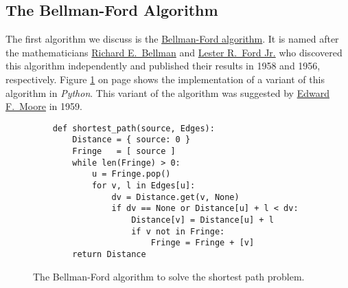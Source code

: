 \subsection{The Bellman-Ford Algorithm}
The first algorithm we discuss is the
\href{https://en.wikipedia.org/wiki/Bellman-Ford_algorithm}{Bellman-Ford algorithm}.
It is named after the mathematicians 
\href{https://en.wikipedia.org/wiki/Richard_E._Bellman}{Richard E.~Bellman} \cite{bellman:58} and 
\href{https://en.wikipedia.org/wiki/L._R._Ford_Jr.}{Lester R.~Ford Jr.} \cite{ford:56} who discovered this algorithm
independently and published their results in 1958 and 1956, respectively.  Figure
\ref{fig:Moore.ipynb} on page \pageref{fig:Moore.ipynb} shows the implementation of a variant of this 
algorithm in \textsl{Python}.  This variant of the algorithm was suggested by 
\href{https://en.wikipedia.org/wiki/Edward_F._Moore}{Edward F.~Moore} \cite{moore:59} 
in 1959.


\begin{figure}[!ht]
  \centering
\begin{verbatim}
    def shortest_path(source, Edges):
        Distance = { source: 0 }
        Fringe   = [ source ]
        while len(Fringe) > 0:
            u = Fringe.pop()
            for v, l in Edges[u]:
                dv = Distance.get(v, None)
                if dv == None or Distance[u] + l < dv:
                    Distance[v] = Distance[u] + l
                    if v not in Fringe: 
                        Fringe = Fringe + [v] 
        return Distance
\end{verbatim}
\vspace*{-0.3cm}
  \caption{The Bellman-Ford algorithm to solve the shortest path problem.}
  \label{fig:Moore.ipynb}
\end{figure} 

